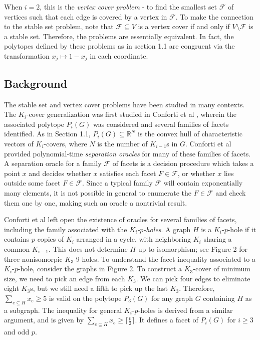When $i=2$, this is the \emph{vertex cover problem} - to find the smallest set $\mathcal{F}$ of vertices such that each edge is covered by a vertex in $\mathcal{F}$. 
To make the connection to the stable set problem, note that $\mathcal{F} \subseteq V$ is a vertex cover if and only if $V \setminus \mathcal{F}$ is a stable set.
Therefore, the problems are essentially equivalent.
In fact, the polytopes defined by these problems as in section 1.1 are congruent via the transformation $x_j \mapsto 1-x_j$ in each coordinate.

\subsection{Background}

The stable set and vertex cover problems have been studied in many contexts. 
The $K_i$-cover generalization was first studied in Conforti et al \cite{conforti}, wherein the associated polytope $P_i(G)$ was considered and several families of facets identified. 
As in Section 1.1, $P_i(G) \subseteq \mathbb{R}^N$ is the convex hull of characteristic vectors of $K_i$-covers, where $N$ is the number of $K_{i-1}$s in $G$. 
Conforti et al provided polynomial-time {\em separation oracles} for many of these families of facets. 
A separation oracle for a family $\mathcal{F}$ of facets is a decision procedure which takes a point $x$ and decides whether $x$ satisfies each facet $F \in \mathcal{F}$, or whether $x$ lies outside some facet $F \in \mathcal{F}$.
Since a typical family $\mathcal{F}$ will contain exponentially many elements, it is not possible in general to enumerate the $F \in \mathcal{F}$ and check them one by one, making such an oracle a nontrivial result.

Conforti et al left open the existence of oracles for several families of facets, including the family associated with the {\em $K_i$-$p$-holes}. 
A graph $H$ is a $K_i$-$p$-hole if it contains $p$ copies of $K_i$ arranged in a cycle, with neighboring $K_i$ sharing a common $K_{i-1}$. 
This does not determine $H$ up to isomorphism; see Figure 2 for three nonisomorpic $K_3$-9-holes.
To understand the facet inequality associated to a $K_i$-$p$-hole, consider the graphs in Figure 2. 
To construct a $K_3$-cover of minimum size, we need to pick an edge from each $K_3$. 
We can pick four edges to eliminate eight $K_3$s, but we still need a fifth to pick up the last $K_3$. 
Therefore, $\sum_{e \subseteq H} x_e \ge 5$ is valid on the polytope $P_3(G)$ for any graph $G$ containing $H$ as a subgraph. 
The inequality for general $K_i$-$p$-holes is derived from a similar argument, and is given by $\sum_{e \subseteq H} x_e \ge \lceil \frac{p}{2} \rceil$.
It defines a facet of $P_i(G)$ for $i \ge 3$ and odd $p$.

